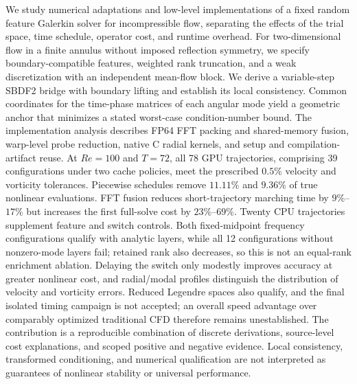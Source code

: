 We study numerical adaptations and low-level implementations of a fixed random feature Galerkin solver for incompressible flow, separating the effects of the trial space, time schedule, operator cost, and runtime overhead. For two-dimensional flow in a finite annulus without imposed reflection symmetry, we specify boundary-compatible features, weighted rank truncation, and a weak discretization with an independent mean-flow block. We derive a variable-step SBDF2 bridge with boundary lifting and establish its local consistency. Common coordinates for the time-phase matrices of each angular mode yield a geometric anchor that minimizes a stated worst-case condition-number bound. The implementation analysis describes FP64 FFT packing and shared-memory fusion, warp-level probe reduction, native C radial kernels, and setup and compilation-artifact reuse. At $Re=100$ and $T=72$, all 78 GPU trajectories, comprising 39 configurations under two cache policies, meet the prescribed $0.5\%$ velocity and vorticity tolerances. Piecewise schedules remove $11.11\%$ and $9.36\%$ of true nonlinear evaluations. FFT fusion reduces short-trajectory marching time by $9\%$--$17\%$ but increases the first full-solve cost by $23\%$--$69\%$. Twenty CPU trajectories supplement feature and switch controls. Both fixed-midpoint frequency configurations qualify with analytic layers, while all 12 configurations without nonzero-mode layers fail; retained rank also decreases, so this is not an equal-rank enrichment ablation. Delaying the switch only modestly improves accuracy at greater nonlinear cost, and radial/modal profiles distinguish the distribution of velocity and vorticity errors. Reduced Legendre spaces also qualify, and the final isolated timing campaign is not accepted; an overall speed advantage over comparably optimized traditional CFD therefore remains unestablished. The contribution is a reproducible combination of discrete derivations, source-level cost explanations, and scoped positive and negative evidence. Local consistency, transformed conditioning, and numerical qualification are not interpreted as guarantees of nonlinear stability or universal performance.
